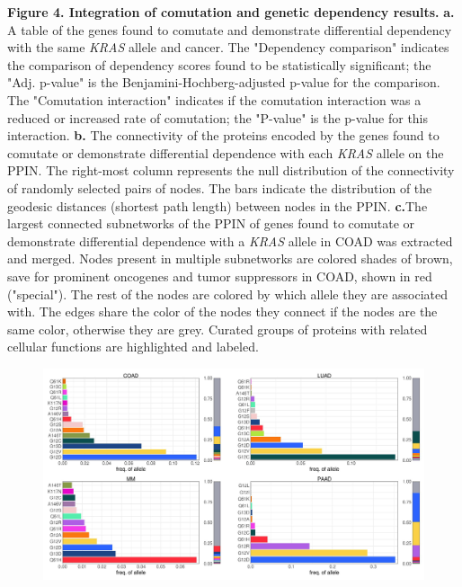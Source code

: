 \documentclass[english, 10pt, letterpaper]{article}
\newcommand{\beginsupplement}{%
        \setcounter{table}{0}
        \renewcommand{\thetable}{\arabic{table}}%
        \setcounter{figure}{0}
        \renewcommand{\thefigure}{\arabic{figure}}%
    }
\newcommand{\KRAS}{\emph{KRAS}}
\begin{document}
\newpage
\noindent \textbf{Figure 4. Integration of comutation and genetic dependency results.}
\textbf{a.} A table of the genes found to comutate and demonstrate differential dependency with the same \KRAS{} allele and cancer. The "Dependency comparison" indicates the comparison of dependency scores found to be statistically significant; the "Adj. p-value" is the Benjamini-Hochberg-adjusted p-value for the comparison. The "Comutation interaction" indicates if the comutation interaction was a reduced or increased rate of comutation; the "P-value" is the p-value for this interaction.
\textbf{b.} The connectivity of the proteins encoded by the genes found to comutate or demonstrate differential dependence with each \KRAS{} allele on the PPIN. The right-most column represents the null distribution of the connectivity of randomly selected pairs of nodes. The bars indicate the distribution of the geodesic distances (shortest path length) between nodes in the PPIN.
\textbf{c.}The largest connected subnetworks of the PPIN of genes found to comutate or demonstrate differential dependence with a \KRAS{} allele in COAD was extracted and merged. Nodes present in multiple subnetworks are colored shades of brown, save for prominent oncogenes and tumor suppressors in COAD, shown in red ("special"). The rest of the nodes are colored by which allele they are associated with. The edges share the color of the nodes they connect if the nodes are the same color, otherwise they are grey. Curated groups of proteins with related cellular functions are highlighted and labeled.
\newpage


\beginsupplement

\makeatletter
\renewcommand{\fnum@figure}{Supplemental \figurename~\thefigure}
\makeatother



\begin{figure}[h!]
\centering
\includegraphics[width=180mm]{figures/Supp_Fig_1.jpeg}
\label{sfig:expanded-kras-allele-distribution}
\end{figure}
\end{document}
